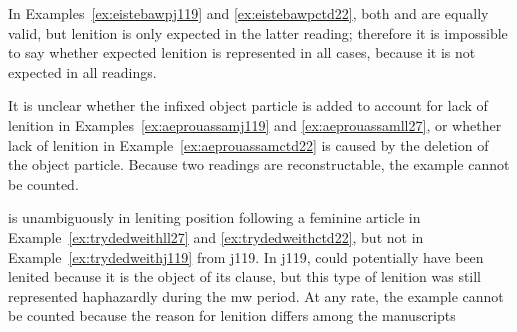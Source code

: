 \begin{mwl}
\end{mwl}
In Examples~\ref{ex:eistebawpj119} and \ref{ex:eistebawpctd22}, both  and  are equally valid, but lenition is only expected in the latter reading; therefore it is impossible to say whether expected lenition is represented in all cases, because it is not expected in all readings.
\begin{mwl}
\end{mwl}
It is unclear whether the infixed object particle  is added to account for lack of lenition in Examples~\ref{ex:aeprouassamj119} and \ref{ex:aeprouassamll27}, or whether lack of lenition in Example~\ref{ex:aeprouassamctd22} is caused by the deletion of the object particle. Because two readings are reconstructable, the example cannot be counted.

\begin{mwl}
\end{mwl}
 is unambiguously in leniting position following a feminine article in Example~\ref{ex:trydedweithll27} and \ref{ex:trydedweithctd22}, but not in Example~\ref{ex:trydedweithj119} from \gls{j119}. In \gls{j119},  could potentially have been lenited because it is the object of its clause, but this type of lenition was still represented haphazardly during the \gls{mw} period. At any rate, the example cannot be counted because the reason for lenition differs among the manuscripts

